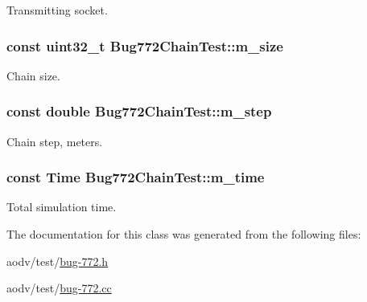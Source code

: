 Transmitting socket. 

\subsubsection[{\texorpdfstring{m\+\_\+size}{m_size}}]{\setlength{\rightskip}{0pt plus 5cm}const uint32\+\_\+t Bug772\+Chain\+Test\+::m\+\_\+size\hspace{0.3cm}{\ttfamily [private]}}\hypertarget{classBug772ChainTest_a7204a38a0c781f1231601e4ee404c8d4}{}\label{classBug772ChainTest_a7204a38a0c781f1231601e4ee404c8d4}


Chain size. 

\subsubsection[{\texorpdfstring{m\+\_\+step}{m_step}}]{\setlength{\rightskip}{0pt plus 5cm}const double Bug772\+Chain\+Test\+::m\+\_\+step\hspace{0.3cm}{\ttfamily [private]}}\hypertarget{classBug772ChainTest_a8b6f1eaf4682f00c5092be2f4b79ffc3}{}\label{classBug772ChainTest_a8b6f1eaf4682f00c5092be2f4b79ffc3}


Chain step, meters. 

\subsubsection[{\texorpdfstring{m\+\_\+time}{m_time}}]{\setlength{\rightskip}{0pt plus 5cm}const {\bf Time} Bug772\+Chain\+Test\+::m\+\_\+time\hspace{0.3cm}{\ttfamily [private]}}\hypertarget{classBug772ChainTest_ad9e30dbc5ae2b796084eb0db5cf46602}{}\label{classBug772ChainTest_ad9e30dbc5ae2b796084eb0db5cf46602}


Total simulation time. 



The documentation for this class was generated from the following files\+:\begin{DoxyCompactItemize}
\item 
aodv/test/\hyperlink{bug-772_8h}{bug-\/772.\+h}\item 
aodv/test/\hyperlink{bug-772_8cc}{bug-\/772.\+cc}\end{DoxyCompactItemize}
